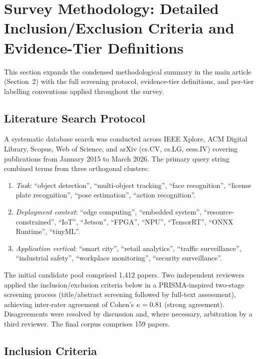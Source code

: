 \documentclass[11pt,a4paper]{article}
\begin{document}
\section{Survey Methodology: Detailed Inclusion/Exclusion Criteria
         and Evidence-Tier Definitions}
\label{sec:meth_criteria}

\noindent This section expands the condensed methodological summary
in the main article (Section~2) with the full screening protocol,
evidence-tier definitions, and per-tier labelling conventions applied
throughout the survey.

\subsection{Literature Search Protocol}

A systematic database search was conducted across IEEE Xplore,
ACM Digital Library, Scopus, Web of Science, and arXiv (cs.CV,
cs.LG, eess.IV) covering publications from January 2015 to
March 2026. The primary query string combined terms from three
orthogonal clusters:

\begin{enumerate}[leftmargin=*, noitemsep]
  \item \textit{Task}: ``object detection'', ``multi-object tracking'',
    ``face recognition'', ``license plate recognition'',
    ``pose estimation'', ``action recognition''.
  \item \textit{Deployment context}: ``edge computing'', ``embedded
    system'', ``resource-constrained'', ``IoT'', ``Jetson'', ``FPGA'',
    ``NPU'', ``TensorRT'', ``ONNX Runtime'', ``tinyML''.
  \item \textit{Application vertical}: ``smart city'', ``retail analytics'',
    ``traffic surveillance'', ``industrial safety'', ``workplace
    monitoring'', ``security surveillance''.
\end{enumerate}

The initial candidate pool comprised 1,412 papers. Two independent
reviewers applied the inclusion/exclusion criteria below in a
PRISMA-inspired two-stage screening process (title/abstract screening
followed by full-text assessment), achieving inter-rater agreement
of Cohen's $\kappa = 0.81$ (strong agreement). Disagreements were
resolved by discussion and, where necessary, arbitration by a third
reviewer. The final corpus comprises 159 papers.

\subsection{Inclusion Criteria}
\end{document}
